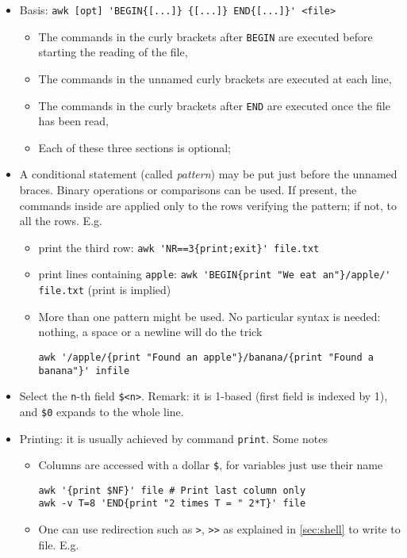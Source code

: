 \documentclass[a4paper,12pt,%
              final%
              ]{article}
\begin{document}
\begin{itemize}
  \item Basis: \verb|awk [opt] 'BEGIN{[...]} {[...]} END{[...]}' <file>|
    \begin{itemize}
      \item The commands in the curly brackets after \texttt{BEGIN} are executed before starting the reading of the file,
      \item The commands in the unnamed curly brackets are executed at each line,
      \item The commands in the curly brackets after \texttt{END} are executed once the file has been read,
      \item Each of these three sections is optional;
    \end{itemize}
  \item A conditional statement (called \emph{pattern}) may be put just before the unnamed braces. Binary operations or comparisons can be used. If present, the commands inside are applied only to the rows verifying the pattern; if not, to all the rows. E.g.
    \begin{itemize}
      \item print the third row: \verb|awk 'NR==3{print;exit}' file.txt|
      \item print lines containing \texttt{apple}: \verb|awk 'BEGIN{print "We eat an"}/apple/' file.txt| (print is implied)
      \item More than one pattern might be used. No particular syntax is needed: nothing, a space or a newline will do the trick
\begin{verbatim}
awk '/apple/{print "Found an apple"}/banana/{print "Found a banana"}' infile
\end{verbatim}
    \end{itemize}
  \item Select the \texttt{n}-th field \verb|$<n>|. Remark: it is 1-based (first field is indexed by 1), and \verb|$0| expands to the whole line.
  \item Printing: it is usually achieved by command \texttt{print}. Some notes
    \begin{itemize}
      \item Columns are accessed with a dollar \verb|$|, for variables just use their name
\begin{verbatim}
awk '{print $NF}' file # Print last column only
awk -v T=8 'END{print "2 times T = " 2*T}' file
\end{verbatim}
      \item One can use redirection such as \verb|>|, \verb|>>| as explained in \autoref{sec:shell} to write to file. E.g.

\end{itemize}
\end{itemize}
\end{document}
